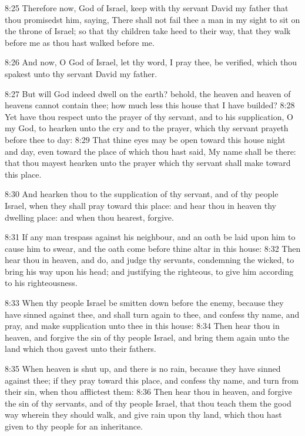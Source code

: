 8:25 Therefore now, \LORD God of Israel, keep with thy servant David my father that thou promisedst him, saying, There shall not fail thee a man in my sight to sit on the throne of Israel; so that thy children take heed to their way, that they walk before me as thou hast walked before me.

8:26 And now, O God of Israel, let thy word, I pray thee, be verified, which thou spakest unto thy servant David my father.

8:27 But will God indeed dwell on the earth? behold, the heaven and heaven of heavens cannot contain thee; how much less this house that I have builded?  8:28 Yet have thou respect unto the prayer of thy servant, and to his supplication, O \LORD my God, to hearken unto the cry and to the prayer, which thy servant prayeth before thee to day: 8:29 That thine eyes may be open toward this house night and day, even toward the place of which thou hast said, My name shall be there: that thou mayest hearken unto the prayer which thy servant shall make toward this place.

8:30 And hearken thou to the supplication of thy servant, and of thy people Israel, when they shall pray toward this place: and hear thou in heaven thy dwelling place: and when thou hearest, forgive.

8:31 If any man trespass against his neighbour, and an oath be laid upon him to cause him to swear, and the oath come before thine altar in this house: 8:32 Then hear thou in heaven, and do, and judge thy servants, condemning the wicked, to bring his way upon his head; and justifying the righteous, to give him according to his righteousness.

8:33 When thy people Israel be smitten down before the enemy, because they have sinned against thee, and shall turn again to thee, and confess thy name, and pray, and make supplication unto thee in this house: 8:34 Then hear thou in heaven, and forgive the sin of thy people Israel, and bring them again unto the land which thou gavest unto their fathers.

8:35 When heaven is shut up, and there is no rain, because they have sinned against thee; if they pray toward this place, and confess thy name, and turn from their sin, when thou afflictest them: 8:36 Then hear thou in heaven, and forgive the sin of thy servants, and of thy people Israel, that thou teach them the good way wherein they should walk, and give rain upon thy land, which thou hast given to thy people for an inheritance.


